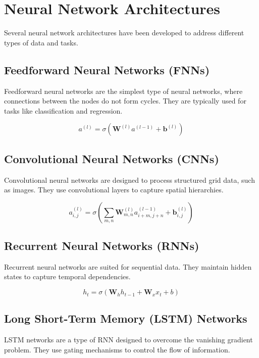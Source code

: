 \section{Neural Network Architectures}
Several neural network architectures have been developed to address different types of data and tasks.

\subsection{Feedforward Neural Networks (FNNs)}
Feedforward neural networks are the simplest type of neural networks, where connections between the nodes do not form cycles. They are typically used for tasks like classification and regression.

\begin{equation}
a^{(l)} = \sigma(\mathbf{W}^{(l)} a^{(l-1)} + \mathbf{b}^{(l)})
\end{equation}

\subsection{Convolutional Neural Networks (CNNs)}
Convolutional neural networks are designed to process structured grid data, such as images. They use convolutional layers to capture spatial hierarchies.

\begin{equation}
a_{i,j}^{(l)} = \sigma\left( \sum_{m,n} \mathbf{W}_{m,n}^{(l)} a_{i+m,j+n}^{(l-1)} + \mathbf{b}_{i,j}^{(l)} \right)
\end{equation}

\subsection{Recurrent Neural Networks (RNNs)}
Recurrent neural networks are suited for sequential data. They maintain hidden states to capture temporal dependencies.

\begin{equation}
h_t = \sigma(\mathbf{W}_h h_{t-1} + \mathbf{W}_x x_t + b)
\end{equation}

\subsection{Long Short-Term Memory (LSTM) Networks}
LSTM networks are a type of RNN designed to overcome the vanishing gradient problem. They use gating mechanisms to control the flow of information.

